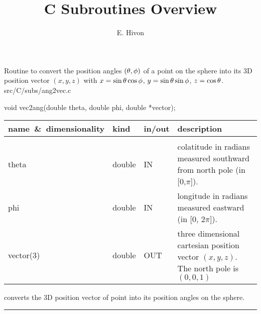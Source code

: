 

\sloppy


\title{\healpix C Subroutines Overview}
 \section[ang2vec]{ }
\label{csub:ang2vec}
\author{E. Hivon}

\begin{facility}
{Routine to convert the position angles $(\theta,\phi)$ of a point on the sphere 
into its 3D position vector $(x,y,z)$ with
$x = \sin\theta\cos\phi$, $y=\sin\theta\sin\phi$, $z=\cos\theta$. 
}
{src/C/subs/ang2vec.c}
\end{facility}

\begin{Cfunction}
{void vec2ang(double theta, double phi, double *vector);}
\end{Cfunction}

\begin{arguments}
{
\begin{tabular}{p{0.3\hsize} p{0.10\hsize} p{0.05\hsize} p{0.45\hsize}} \hline  
\textbf{name~\&~dimensionality} & \textbf{kind} & \textbf{in/out} & \textbf{description} \\ \hline
                   &   &   &                           \\ %
theta & double & IN & colatitude in radians measured southward from north pole (in
    [0,$\pi$]). \\
phi   & double & IN & longitude in radians measured eastward (in [0, $2\pi$]).\\
vector(3) & double & OUT & three dimensional cartesian position vector
                   $(x,y,z)$. The north pole is $(0,0,1)$\\
\end{tabular}
}
\end{arguments}



\begin{related}
  \begin{sulist}{} %
  \item[\htmlref{vec2ang}{csub:vec2ang}] converts the 3D position vector of point into its position
  angles on the sphere.
  \end{sulist}
\end{related}

\rule{\hsize}{2mm}

